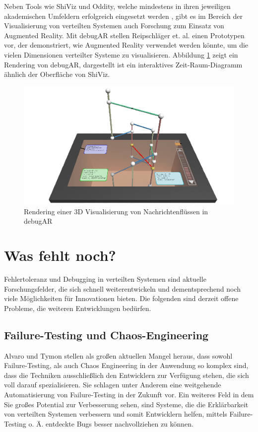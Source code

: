 \documentclass[12pt,a4paper]{report}
\begin{document}
Neben Tools wie ShiViz und Oddity, welche mindestens in ihren jeweiligen akademischen Umfeldern erfolgreich eingesetzt werden
\cite{ShiViz_usage_study, oddity_usage_in_education}, gibt es im Bereich der Visualisierung von verteilten Systemen auch Forschung
zum Einsatz von Augmented Reality. Mit debugAR stellen Reipschläger et. al. \cite{debugAR_AR_debugger} einen Prototypen vor, der
demonstriert, wie Augmented Reality verwendet werden könnte, um die vielen Dimensionen verteilter Systeme zu visualisieren.
Abbildung \ref{fig:debugAR} zeigt ein Rendering von debugAR, dargestellt ist ein interaktives Zeit-Raum-Diagramm ähnlich der
Oberfläche von ShiViz.

\begin{figure}[H]
	\centering
	\includegraphics[width=\linewidth]{img/debugAR_rendering.png}
	\caption{Rendering einer 3D Visualisierung von Nachrichtenflüssen in debugAR \cite{debugAR_AR_debugger}}
	\label{fig:debugAR}
\end{figure}

\section{Was fehlt noch?}
Fehlertoleranz und Debugging in verteilten Systemen sind aktuelle Forschungsfelder, die sich schnell weiterentwickeln und
dementsprechend noch viele Möglichkeiten für Innovationen bieten. Die folgenden sind derzeit offene Probleme, die weiteren
Entwicklungen bedürfen.

\subsection{Failure-Testing und Chaos-Engineering}
Alvaro und Tymon \cite{abstracting_the_geniuses} stellen als großen aktuellen Mangel heraus, dass sowohl Failure-Testing, als auch
Chaos Engineering in der Anwendung so komplex sind, dass die Techniken ausschließlich den Entwicklern zur Verfügung stehen, die
sich voll darauf spezialisieren. Sie schlagen unter Anderem eine weitgehende Automatisierung von Failure-Testing in der Zukunft
vor. Ein weiteres Feld in dem Sie großes Potential zur Verbesserung sehen, sind Systeme, die die Erklärbarkeit von verteilten
Systemen verbessern und somit Entwicklern helfen, mittels Failure-Testing o. Ä. entdeckte Bugs besser nachvollziehen zu können.
\end{document}
